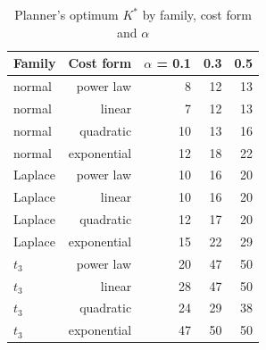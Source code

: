 \begin{table}[htbp]
\centering
\caption{Planner's optimum $K^*$ by family, cost form and $\alpha$}
\label{tab:a1_kstar}
\small
\begin{tabular}{lrrrr}
\toprule
Family & Cost form & $\alpha$ = 0.1 & 0.3 & 0.5 \\
\midrule
normal & power law & 8 & 12 & 13 \\
normal & linear & 7 & 12 & 13 \\
normal & quadratic & 10 & 13 & 16 \\
normal & exponential & 12 & 18 & 22 \\
Laplace & power law & 10 & 16 & 20 \\
Laplace & linear & 10 & 16 & 20 \\
Laplace & quadratic & 12 & 17 & 20 \\
Laplace & exponential & 15 & 22 & 29 \\
$t_3$ & power law & 20 & 47 & 50 \\
$t_3$ & linear & 28 & 47 & 50 \\
$t_3$ & quadratic & 24 & 29 & 38 \\
$t_3$ & exponential & 47 & 50 & 50 \\
\bottomrule
\end{tabular}
\end{table}
